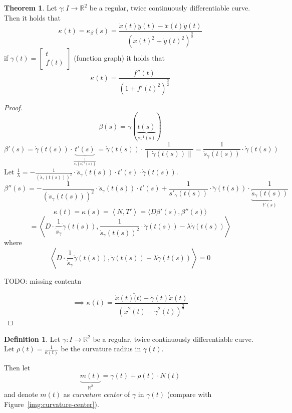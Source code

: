 \documentclass[a4paper,landscape,twocolumn]{article}
\theoremstyle{definition}
\newtheorem{theorem}{Theorem}
\newtheorem{defi}{Definition}
\newcommand\norm[1]{\left\|#1\right\|}
\newcommand\ang[2]{\left\langle#1,#2\right\rangle}
\begin{document}
\begin{theorem}
  Let $\gamma: I \to \mathbb R^2$ be a regular, twice continuously differentiable
  curve. Then it holds that
  \[ \kappa(t) = \kappa_{\beta}(s) = \frac{\dot{x}(t) \ddot{y}(t) - \ddot{x}(t) \dot{y}(t)}{(\dot{x}(t)^2 + \dot{y}(t)^2)^{\frac32}} \]
  if $\gamma(t) = \begin{bmatrix} t \\ f(t) \end{bmatrix}$ (function graph) it holds that
  \[ \kappa(t) = \frac{f''(t)}{(1 + f'(t)^2)^{\frac32}} \]
\end{theorem}

\begin{proof}
  \[ \beta(s) = \gamma(\underbrace{t(s)}_{s_\gamma^{-1}(s)}) \]
  \[
    \beta'(s) =
    \dot{\gamma}(t(s)) \cdot \underbrace{t'(s)}_{\frac{1}{\dot{s}_{\gamma}(s_\gamma^{-1}(s))}}
    = \dot{\gamma}(t(s)) \cdot \frac{1}{\norm{\dot{\gamma}(t(s))}}
    = \frac{1}{\dot{s}_\gamma(t(s))} \cdot \dot{\gamma}(t(s))
  \]
  Let $\frac1{\lambda} = -\frac{1}{(\dot{s}_\gamma(t(s)))^2} \cdot \ddot{s}_\gamma(t(s)) \cdot t'(s) \cdot \dot{\gamma}(t(s))$.
  \[
    \beta''(s) = -\frac{1}{(\dot{s}_\gamma(t(s)))^2} \cdot \ddot{s}_\gamma(t(s)) \cdot t'(s)
    + \frac{1}{s'_\gamma(t(s))} \cdot \ddot{\gamma}(t(s)) \cdot \underbrace{\frac{1}{\dot{s}_\gamma(t(s))}}_{t'(s)}
  \] \[
    \kappa(t) = \kappa(s) = \ang{N}{T'} = \langle D\beta'(s), \beta''(s)\rangle
  \] \[
    = \ang{D \cdot \frac{1}{\dot{s}_\gamma} \dot\gamma(t(s))}{\frac{1}{\dot{s}_\gamma(t(s))^2} \cdot \ddot{\gamma}(t(s)) - \lambda \dot{\gamma}(t(s))}
  \]
  where
  \[
    \ang{D \cdot \frac{1}{\dot{s}_\gamma} \dot\gamma(t(s))}{\ddot{\gamma}(t(s)) - \lambda \dot{\gamma}(t(s))} = 0
  \]

  TODO: missing contentn

  \[
    \implies
    \kappa(t) = \frac{\dot{x}(t) \ddot(t) - \dot\gamma(t) \dot{x}(t)}{(\dot{x}^2(t) + \dot{\gamma}^2(t))^{\frac32}}
  \]
\end{proof}

\begin{defi}
  Let $\gamma: I \to \mathbb R^2$ be a regular, twice continuously differentiable curve.
  Let $\rho(t) = \frac{1}{\kappa(t)}$ be the curvature radius in $\gamma(t)$.

  Then let
  \[ \underbrace{m(t)}_{\mathbb R^2} = \gamma(t) + \rho(t) \cdot N(t) \]
  and denote $m(t)$ as \emph{curvature center} of $\gamma$ in $\gamma(t)$
  (compare with Figure~\ref{img:curvature-center}).
\end{defi}
\end{document}
